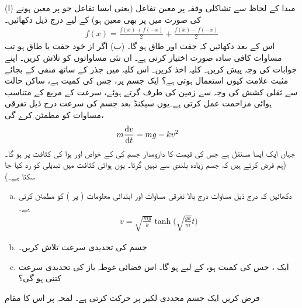 (ا) مبدا کے لحاظ سے تشاکلی وقفہ پر معین  تفاعل  (یعنی ایسا تفاعل جو  پر معین ہونے کی صورت میں  پر بھی معین ہو) کے لیے درج ذیل دکھائیں۔
\begin{align}\label{مساوات_ماورائی_جفت_طاق_حصے}
f(x)=\frac{f(x)+f(-x)}{2}+\frac{f(x)-f(-x)}{2}
\end{align}
اس کے بعد دکھائیں کہ  جفت اور  طاق ہو گا۔ (ب) اگر  از خود جفت یا طاق ہو تب مساوات   کافی سادہ صورت اختیار کرتی ہے۔ ان نئی مساواتوں کو تلاش کریں۔ اپنے جوابات کی وجہ پیش کریں۔
کلیہ  اخذ کریں۔ اس کلیہ میں جذر کے ساتھ منفی کے بجائے مثبت علامت کیوں استعمال ہوتی  ہے؟
ایک جسم پر، جس کی کمیت  ہے،  ساکن حالت سے ثقلی کشش کی وجہ سے  زمین کی طرف گرتے ہوئے، سرعت  کے مربع کے متناسب ہوائی مزاحمت عمل کرتی ہے۔یوں  سیکنڈ بعد  جسم کی سرعت درج ذیل تفرقی مساوات کو مطمئن کرے گی،
\begin{align*}
m\frac{\dif v}{\dif t}&=mg-kv^2
\end{align*}
جہاں  ایک ایسا مستقل ہے جس کی قیمت کا دارومدار جسم کی   کے خواص اور ہوا کی کثافت پر  ہو گا۔ (ہم فرض کرتے ہیں کہ جسم زیادہ بلندی سے نہیں گرتا۔ یوں ہوائی کثافت میں تبدیلی کو رد کیا جا سکتا ہے۔) 
\begin{enumerate}[a.]
\item
دکھائیں کہ درج ذیل مساوات   درج بالا تفرقی مساوات اور ابتدائی معلومات ( پر ) کو مطمئن کرتی ہے۔ 
\begin{align*}
v=\sqrt{\frac{mg}{k}}\tanh\big(\sqrt{\frac{gk}{m}}t\big)
\end{align*}
\item
جسم کی تحدیدی سرعت  تلاش کریں۔
\item
ایک ، جس کی کمیت  ہو، کے لیے  ہو گا۔ اس فضائی غوطہ باز کی تحدیدی سرعت کتنی ہو گی؟
\end{enumerate}
فرض کریں ایک جسم محددی لکیر پر حرکت کرتی ہے۔ لمحہ  پر اس کا مقام
